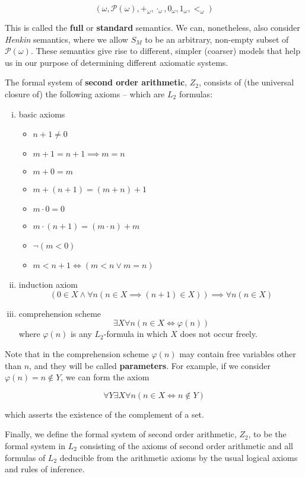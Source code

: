 \documentclass[../main.tex]{memoir}
\begin{document}
\[
  (\omega, \mathcal{P}(\omega), +_{\omega}, \cdot_{\omega}, 0_{\omega}, 1_{\omega}, <_{\omega})
\]

This is called the \textbf{full} or \textbf{standard} semantics. We can, nonetheless, also consider \textit{Henkin} semantics, where we allow $S_M$ to be an arbitrary, non-empty subset of $\mathcal{P}(\omega)$. These semantics give rise to different, simpler (coarser) models that help us in our purpose of determining different axiomatic systems.

The formal system of \textbf{second order arithmetic}, $Z_2$, consists of (the universal closure of) the following axioms -- which are $L_2$ formulas:

\begin{enumerate}[(i)]
\item basic axioms
  \begin{itemize}
  \item $n + 1 \neq 0$
  \item $m + 1 = n + 1 \implies m = n$
  \item $m + 0 = m$
  \item $m + (n + 1) = (m + n) + 1$
  \item $m \cdot 0 = 0$
  \item $m \cdot (n + 1) = (m \cdot n) + m$
  \item $\neg(m < 0)$
  \item $m < n + 1 \iff (m < n \lor m = n)$
  \end{itemize}
\item induction axiom
  $$(0 \in X \land \forall n (n \in X \implies (n + 1) \in X)) \implies \forall n (n \in X)$$
\item comprehension scheme
  $$\exists X \forall n (n \in X \iff \varphi(n))$$
  where $\varphi(n)$ is any $L_2$-formula in which $X$ does not occur freely.
\end{enumerate}

Note that in the comprehension scheme $\varphi(n)$ may contain free variables other than $n$, and they will be called \textbf{parameters}. For example, if we consider $\varphi(n) = n \not\in Y$, we can form the axiom

$$ \forall Y \exists X \forall n (n \in X \iff n \not\in Y) $$

which asserts the existence of the complement of a set.

Finally, we define the formal system of second order arithmetic, $Z_2$, to be the formal system in $L_2$ consisting of the axioms of second order arithmetic and all formulas of $L_2$ deducible from the arithmetic axioms by the usual logical axioms and rules of inference. \\
\end{document}
